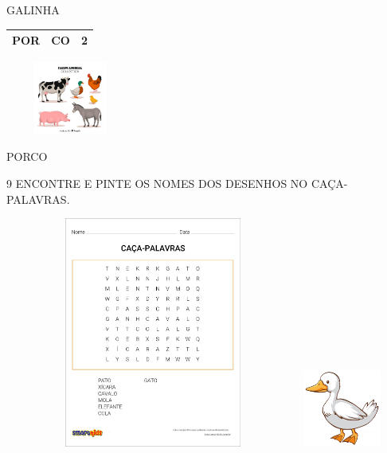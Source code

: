 GALINHA

\begin{longtable}[]{@{}lll@{}}
\toprule
POR & CO & 2\tabularnewline
\bottomrule
\end{longtable}

\includegraphics[width=1.66606in,height=0.94389in]{media/image27.jpg}

PORCO




\num{9} ENCONTRE E PINTE OS NOMES DOS DESENHOS NO CAÇA-PALAVRAS.


\includegraphics[width=3.83611in,height=2.98958in]{media/image29.jpg}
\includegraphics[width=1.00625in,height=0.99857in]{media/image30.png}

